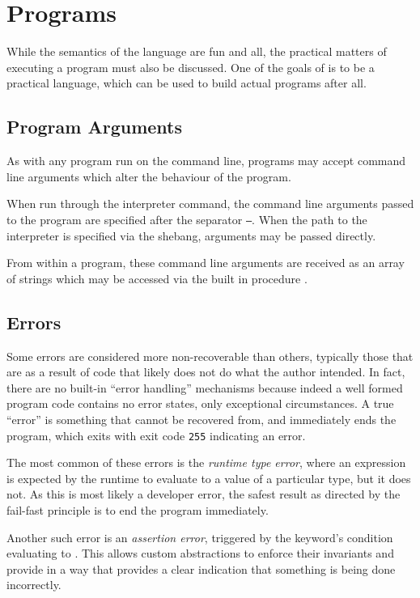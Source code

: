 \section{Programs}

While the semantics of the language are fun and all, the practical matters of
executing a program must also be discussed. One of the goals of \Trilogy{} is
to be a practical language, which can be used to build actual programs after
all.

\subsection{Program Arguments}

As with any program run on the command line, \Trilogy{} programs may accept
command line arguments which alter the behaviour of the program.

When run through the interpreter command, the command line arguments passed
to the \Trilogy{} program are specified after the separator \texttt{--}. When
the path to the \Trilogy{} interpreter is specified via the shebang, arguments
may be passed directly.

From within a \Trilogy{} program, these command line arguments are received
as an array of strings which may be accessed via the built in procedure
.

\subsection{Errors}

Some errors are considered more non-recoverable than others, typically those
that are as a result of code that likely does not do what the author intended.
In fact, there are no built-in ``error handling'' mechanisms because indeed
a well formed \Trilogy{} program code contains no error states, only exceptional
circumstances. A true ``error'' is something that cannot be recovered from, and
immediately ends the \Trilogy{} program, which exits with exit code \texttt{255}
indicating an error.

The most common of these errors is the \emph{runtime type error}, where an
expression is expected by the runtime to evaluate to a value of a particular
type, but it does not. As this is most likely a developer error, the safest
result as directed by the fail-fast principle is to end the program immediately.

Another such error is an \emph{assertion error}, triggered by the  keyword's
condition evaluating to . This allows custom abstractions to enforce
their invariants and provide in a way that provides a clear indication that
something is being done incorrectly.

